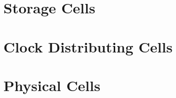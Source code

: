 





















\chapter{Storage Cells}





\chapter{Clock Distributing Cells}





\chapter{Physical Cells}









